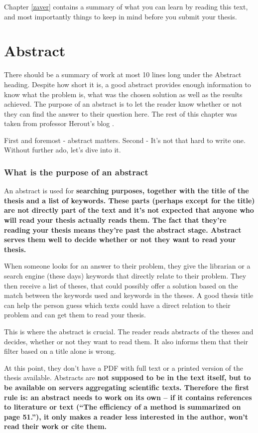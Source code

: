 Chapter \ref{zaver} contains a summary of what you can learn by reading this text, and most importantly things to keep in mind before you submit your thesis.

\chapter{Abstract}
\label{abstrakt}

There should be a summary of work at most 10 lines long under the Abstract heading. Despite how short it is, a good abstract provides enough information to know what the problem is, what was the chosen solution as well as the results achieved. The purpose of an abstract is to let the reader know whether or not they can find the answer to their question here. The rest of this chapter was taken from professor Herout's blog \cite{Herout}.
\bigskip

\noindent First and foremost - abstract matters. Second - It's not that hard to write one. Without further ado, let's dive into it.

\subsection*{What is the purpose of an abstract}
An abstract is used for \bf searching \rm purposes, together with the title of the thesis and a list of keywords. These parts (perhaps except for the title) are not directly part of the text and it's not expected that anyone who will read your thesis actually reads them. The fact that they're reading your thesis means they're past the abstract stage. Abstract serves them well to decide \bf whether or not \rm they want to read your thesis.

When someone looks for an answer to their problem, they give the librarian or a search engine (these days) keywords that directly relate to their problem. They then receive a list of theses, that could possibly offer a solution based on the match between the keywords used and keywords in the theses. A good thesis title can help the person guess which texts could have a direct relation to their problem and can get them to read your thesis.

This is where the abstract is crucial. The reader reads abstracts of the theses and decides, whether or not they want to read them. It also informs them that their filter based on a title alone is wrong.

At this point, they don't have a PDF with full text or a printed version of the thesis available. Abstracts are \bf not \rm supposed to be in the text itself, but to be available on servers aggregating scientific texts. Therefore the first rule is: an abstract needs to work on its own -- if it contains references to literature or text (``The efficiency of a method is summarized on page 51.''), it only makes a reader less interested in the author, won't read their work or cite them.


